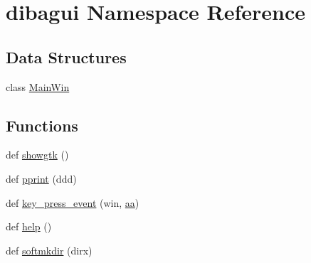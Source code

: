 \hypertarget{namespacedibagui}{}\section{dibagui Namespace Reference}
\label{namespacedibagui}
\subsection*{Data Structures}
\begin{DoxyCompactItemize}
\item 
class \hyperlink{classdibagui_1_1_main_win}{Main\+Win}
\end{DoxyCompactItemize}
\subsection*{Functions}
\begin{DoxyCompactItemize}
\item 
def \hyperlink{namespacedibagui_aafe5e93f05012b5ea1b7a6a2ea5e304e}{showgtk} ()
\item 
def \hyperlink{namespacedibagui_ad90cbb2f2f6f630b3d1702505a041b97}{pprint} (ddd)
\item 
def \hyperlink{namespacedibagui_af9201c0c99ec1ad4e21908a912bac70b}{key\+\_\+press\+\_\+event} (win, \hyperlink{namespacedibagui_a74b87337454200d4d33f80c4663dc5e5}{aa})
\item 
def \hyperlink{namespacedibagui_ab3b526f5276db90995805fd06c280b74}{help} ()
\item 
def \hyperlink{namespacedibagui_ab81281419da07ffb44732c0d233b7134}{softmkdir} (dirx)
\end{DoxyCompactItemize}
